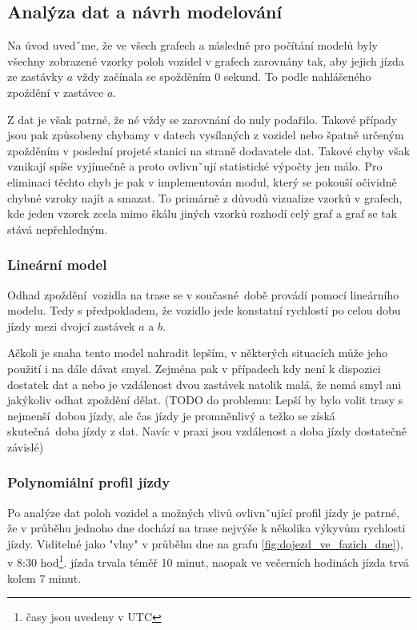 \subsection{Analýza dat a návrh modelování} \label{subsubsection:analyza_dat}

Na úvod uvedˇme, že ve všech grafech a následně pro počítání modelů byly všechny zobrazené vzorky poloh vozidel v grafech zarovnány tak, aby jejich jízda ze zastávky $a$ vždy začínala se spožděním 0 sekund. To podle nahlášeného zpoždění v zastávce $a$.

\bigbreak

Z dat je však patrné, že né vždy se zarovnání do nuly podařilo. Takové případy jsou pak způsobeny chybamy v datech vysílaných z vozidel nebo špatně určeným zpožděním v poslední projeté stanici na straně dodavatele dat. Takové chyby však vznikají spíše vyjímečně a proto ovlivnˇují statistické výpočty jen málo. Pro eliminaci těchto chyb je pak v implementován modul, který se pokouší očividně chybné vzroky najít a smazat. To primárně z důvodů vizualize vzorků v grafech, kde jeden vzorek zcela mimo škálu jiných vzorků rozhodí celý graf a graf se tak stává nepřehledným.

\subsubsection{Lineární model}


Odhad zpoždění vozidla na trase se v současné době provádí pomocí lineárního modelu. Tedy s předpokladem, že vozidlo jede konstatní rychlostí po celou dobu jízdy mezi dvojcí zastávek $a$ a $b$.

\bigbreak

Ačkoli je snaha tento model nahradit lepším, v některých situacích může jeho použití i na dále dávat smysl. Zejména pak v případech kdy není k dispozici dostatek dat a nebo je vzdálenost dvou zastávek natolik malá, že nemá smyl ani jakýkoliv odhat zpoždění dělat. (TODO do problemu: Lepší by bylo volit trasy s nejmenší dobou jízdy, ale čas jízdy je promněnlivý a težko se získá skutečná doba jízdy z dat. Navíc v praxi jsou vzdálenost a doba jízdy dostatečně závislé)

\subsubsection{Polynomiální profil jízdy}

Po analýze dat poloh vozidel a možných vlivů ovlivnˇující profil jízdy je patrné, že v průběhu jednoho dne dochází na trase nejvýše k několika výkyvům rychlosti jízdy. Viditelné jako "vlny" v průběhu dne na grafu \ref{fig:dojezd_ve_fazich_dne}), v 8:30 hod\footnote{časy jsou uvedeny v UTC}. jízda trvala téměř 10 minut, naopak ve večerních hodinách jízda trvá kolem 7 minut.

